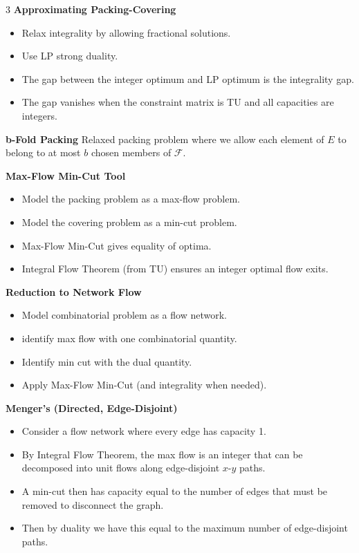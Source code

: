 \documentclass[10pt, landscape]{article}
\begin{document}
\begin{multicols*}{3}
\textbf{Approximating Packing-Covering}
\begin{itemize}
    \item Relax integrality by allowing fractional solutions.
    \item Use LP strong duality.
    \item The gap between the integer optimum and LP optimum is the integrality gap.
    \item The gap vanishes when the constraint matrix is TU and all capacities are integers.
\end{itemize}

\textbf{b-Fold Packing} Relaxed packing problem where we allow each element of $E$ to belong to at most $b$ chosen members of $\mathcal{F}$.

\textbf{Max-Flow Min-Cut Tool}
\begin{itemize}
    \item Model the packing problem as a max-flow problem.
    \item Model the covering problem as a min-cut problem.
    \item Max-Flow Min-Cut gives equality of optima.
    \item Integral Flow Theorem (from TU) ensures an integer optimal flow exits.
\end{itemize}

\textbf{Reduction to Network Flow}
\begin{itemize}
    \item Model combinatorial problem as a flow network.
    \item identify max flow with one combinatorial quantity.
    \item Identify min cut with the dual quantity.
    \item Apply Max-Flow Min-Cut (and integrality when needed).
\end{itemize}

\textbf{Menger's (Directed, Edge-Disjoint)}
\begin{itemize}
    \item Consider a flow network where every edge has capacity 1.
    \item By Integral Flow Theorem, the max flow is an integer that can be decomposed into unit flows along edge-disjoint $x$-$y$ paths.
    \item A min-cut then has capacity equal to the number of edges that must be removed to disconnect the graph.
    \item Then by duality we have this equal to the maximum number of edge-disjoint paths.
\end{itemize}


\end{multicols*}
\end{document}

